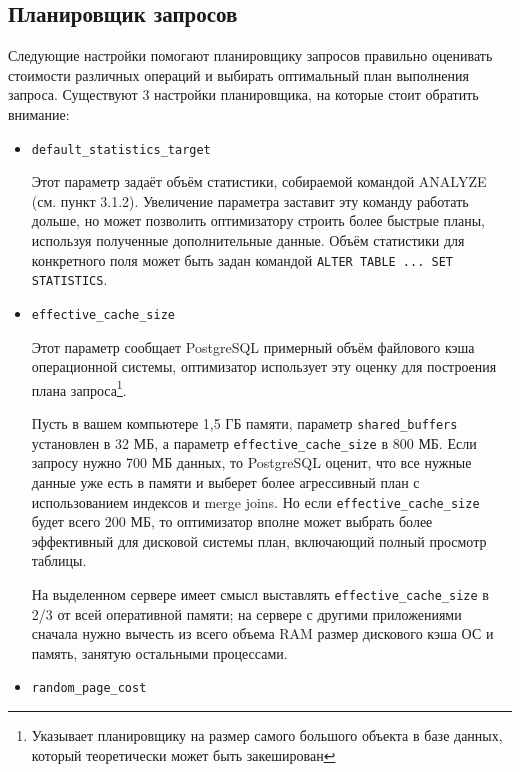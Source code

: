 \subsection{Планировщик запросов}

Следующие настройки помогают планировщику запросов правильно оценивать стоимости различных операций и выбирать оптимальный план выполнения запроса. Существуют 3 настройки планировщика, на которые стоит обратить внимание:

\begin{itemize}
  \item \lstinline!default_statistics_target!

  Этот параметр задаёт объём статистики, собираемой командой ANALYZE (см. пункт 3.1.2). Увеличение параметра заставит эту команду работать дольше, но может позволить оптимизатору строить более быстрые планы, используя полученные дополнительные данные. Объём статистики для конкретного поля может быть задан командой \lstinline!ALTER TABLE ... SET STATISTICS!.

  \item \lstinline!effective_cache_size!

  Этот параметр сообщает PostgreSQL примерный объём файлового кэша операционной системы, оптимизатор использует эту оценку для построения плана запроса\footnote{Указывает планировщику на размер самого большого объекта в базе данных, который теоретически может быть закеширован}.

Пусть в вашем компьютере 1,5 ГБ памяти, параметр \lstinline!shared_buffers! установлен в 32 МБ, а параметр \lstinline!effective_cache_size! в 800 МБ. Если запросу нужно 700 МБ данных, то PostgreSQL оценит, что все нужные данные уже есть в памяти и выберет более агрессивный план с использованием индексов и merge joins. Но если \lstinline!effective_cache_size! будет всего 200 МБ, то оптимизатор вполне может выбрать более эффективный для дисковой системы план, включающий полный просмотр таблицы.

На выделенном сервере имеет смысл выставлять \lstinline!effective_cache_size! в 2/3 от всей оперативной памяти; на сервере с другими приложениями сначала нужно вычесть из всего объема RAM размер дискового кэша ОС и память, занятую остальными процессами.

  \item \lstinline!random_page_cost!


\end{itemize}
